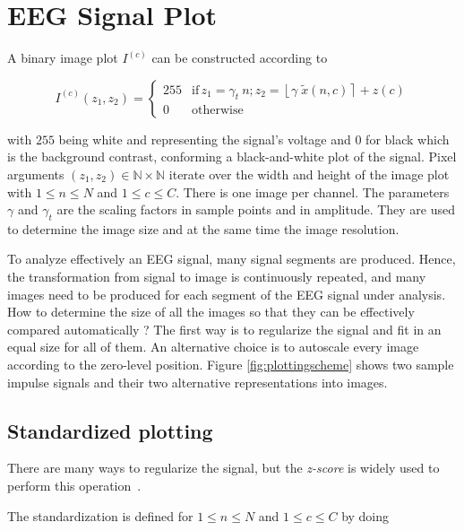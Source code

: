 \section{EEG Signal Plot}

A binary image plot $I^{(c)}$ can be constructed according to

\begin{equation}
I^{(c)}(z_1,z_2) = \left\{ \begin{array}{rl}
255 & \text{if} \,  z_1 = \gamma_{t} \  n; \! z_2 = \left\lfloor \gamma \; \tilde{x}(n,c) \right\rceil + z(c) \\
0   & \mbox{otherwise}
\end{array}\right.
\label{eq:images}
\end{equation}

\noindent with $255$ being white and representing the signal's voltage and $0$ for black which is the background contrast, conforming a black-and-white plot of the signal.  Pixel arguments $ (z_1,z_2) \in \mathbb{N} \times \mathbb{N}$ iterate over the width and height of the image plot with $1 \leq n \leq N$ and $1 \leq c \leq C$.  There is one image per channel.  The parameters $\gamma$ and $\gamma_t$ are the scaling factors in sample points and in amplitude.  They are used to determine the image size and at the same time the image resolution.

To analyze effectively an EEG signal, many signal segments are produced.  Hence, the transformation from signal to image is continuously repeated, and many images need to be produced for each segment of the EEG signal under analysis.  How to determine the size of all the images so that they can be effectively compared automatically ?  The first way is to regularize the signal and fit in an equal size for all of them.  An alternative choice is to autoscale every image according to the zero-level position.  Figure \ref{fig:plottingscheme} shows two sample impulse signals and their two alternative representations into images.

\subsection{Standardized plotting}

There are many ways to regularize the signal, but the \textit{z-score} is widely used to perform this operation~\cite{Zhang2013}.

The standardization is defined for  $1 \leq n \leq N$ and $1 \leq c \leq C$ by doing

